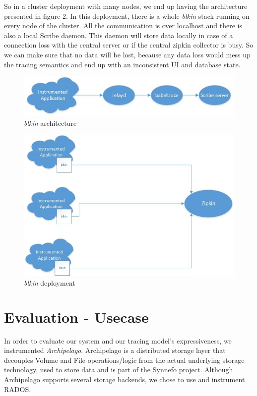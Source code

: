 \documentclass[a4paper,12pt]{article}
\begin{document}
So in a cluster deployment with many nodes, we end up having the architecture
presented in figure 2. In this deployment, there is a whole \emph{blkin} stack 
running on every node of the cluster. All the communication is over localhost 
and there is also a local Scribe daemon. This daemon will store data locally in
case of a connection loss with the central server or if the central zipkin 
collector is busy. So we can make sure that no data will be lost, because any
data loss would mess up the tracing semantics and end up with an inconsistent UI
and database state.

\begin{figure}[h!]
  \centering
  \includegraphics[scale=0.75]{images/specific.jpg}
  \caption{\emph{blkin} architecture}
\end{figure}

\begin{figure}[h!]
  \centering
  \includegraphics[scale=0.75]{images/generic.jpg}
  \caption{\emph{blkin} deployment}
\end{figure}

\section{Evaluation - Usecase}

In order to evaluate our system and our tracing model's expressiveness, we 
instrumented \emph{Archipelago}\cite{archip}. Archipelago is a distributed 
storage layer that decouples Volume and File operations/logic from the actual
underlying storage technology, used to store data and is part of the Synnefo 
project\cite{synnefo}. Although Archipelago supports several storage backends,
we chose to use and instrument RADOS\cite{rados}. 
\end{document}
